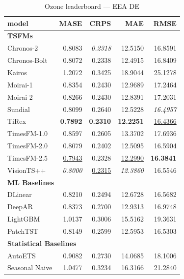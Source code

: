 \begin{table}[H]
\caption{Ozone leaderboard --- EEA DE}
\centering
\begin{small}
\begin{tabular}{lrrrr}
\toprule
model & MASE & CRPS & MAE & RMSE \\
\midrule
\multicolumn{5}{l}{\textbf{TSFMs}} \\
Chronos-2 & 0.8083 & \textit{0.2318} & 12.5150 & 16.8591 \\
Chronos-Bolt & 0.8072 & 0.2338 & 12.4915 & 16.8409 \\
Kairos & 1.2072 & 0.3425 & 18.9044 & 25.1278 \\
Moirai-1 & 0.8354 & 0.2430 & 12.9689 & 17.2464 \\
Moirai-2 & 0.8266 & 0.2430 & 12.8391 & 17.2031 \\
Sundial & 0.8099 & 0.2640 & 12.5228 & \textit{16.4957} \\
TiRex & \textbf{0.7892} & \textbf{0.2310} & \textbf{12.2251} & \underline{16.4366} \\
TimesFM-1.0 & 0.8597 & 0.2605 & 13.3702 & 17.6936 \\
TimesFM-2.0 & 0.8079 & 0.2402 & 12.5095 & 16.5904 \\
TimesFM-2.5 & \underline{0.7943} & 0.2328 & \underline{12.2990} & \textbf{16.3841} \\
VisionTS++ & \textit{0.8000} & \underline{0.2315} & \textit{12.3860} & 16.5546 \\
\midrule
\multicolumn{5}{l}{\textbf{ML Baselines}} \\
DLinear & 0.8210 & 0.2494 & 12.6728 & 16.5682 \\
DeepAR & 0.8373 & 0.2700 & 12.9313 & 16.9748 \\
LightGBM & 1.0137 & 0.3006 & 15.5162 & 19.3631 \\
PatchTST & 0.8149 & 0.2599 & 12.5953 & 16.5303 \\
\midrule
\multicolumn{5}{l}{\textbf{Statistical Baselines}} \\
AutoETS & 0.9082 & 0.2730 & 14.0685 & 18.1006 \\
Seasonal Naive & 1.0477 & 0.3234 & 16.3166 & 21.2840 \\
\bottomrule
\end{tabular}
\end{small}
\end{table}